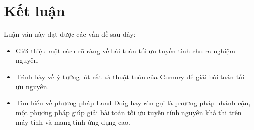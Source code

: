 \documentclass[12pt,a4paper]{report}
\begin{document}
\chapter*{Kết luận}                         %
\indent
\thispagestyle{fancy}

Luận văn này đạt được các vấn đề sau đây:

\begin{itemize}
    \item Giới thiệu một cách rõ ràng về bài toán tối ưu tuyến tính cho ra nghiệm nguyên.
    \item Trình bày về ý tưởng lát cắt và thuật toán của Gomory để giải bài toán tối ưu nguyên.
	\item Tìm hiểu về phương pháp Land-Doig hay còn gọi là phương pháp nhánh cận, một phương pháp giúp giải bài toán tối ưu tuyến tính nguyên khả thi trên máy tính và mang tính ứng dụng cao.
\end{itemize}
\nocite{*}


\end{document}
